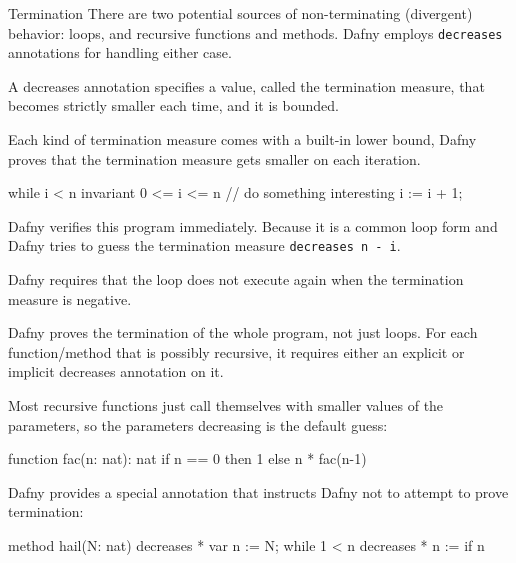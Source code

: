 \documentclass[10pt, compress]{beamer}
\begin{document}
\begin{frame}[fragile]{Termination}
There are two potential sources of non-terminating (divergent) behavior: loops, and recursive functions and methods. 
Dafny employs \verb|decreases| annotations for handling either case.

A decreases annotation specifies a value, called the termination measure, that becomes strictly smaller each time, and it is bounded.

Each kind of termination measure comes with a built-in lower bound,
Dafny proves that the termination measure gets smaller on each iteration. 
\end{frame}

\begin{frame}[fragile]
  \begin{verbnobox}[\footnotesize]
while i < n
   invariant 0 <= i <= n
{
   // do something interesting
   i := i + 1;
}
  \end{verbnobox}
Dafny verifies this program immediately. Because it is a common loop form and Dafny tries to guess the termination measure \verb|decreases n - i|.

Dafny requires that the loop does not execute again when the termination measure is negative. 
\end{frame}

\begin{frame}[fragile]
Dafny proves the termination of the whole program, not just loops.
For each function/method that is possibly recursive, it requires either an explicit or implicit decreases annotation on it.

Most recursive functions just call themselves with smaller values of the parameters, so the parameters decreasing is the default guess:
  \begin{verbnobox}[\footnotesize]
function fac(n: nat): nat
{
   if n == 0 then 1 else n * fac(n-1)
}
  \end{verbnobox}
\end{frame}

\begin{frame}[fragile]
Dafny provides a special annotation that instructs Dafny not to attempt to prove termination:
  \begin{verbnobox}[\footnotesize]
method hail(N: nat)
   decreases *
{
   var n := N;
   while 1 < n
      decreases *
   { 
      n := if n %
   }
}
  \end{verbnobox}
\end{frame}
\end{document}
